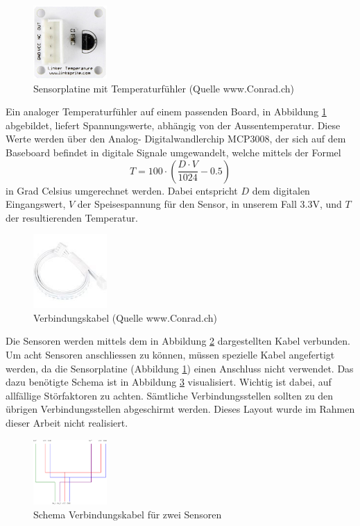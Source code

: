 \begin{figure}[H]%
\centering
\includegraphics[width=0.25\textwidth]{Images/Sensorplatine.jpg}
\caption{Sensorplatine mit Temperaturfühler (Quelle www.Conrad.ch)}
\label{fig:sensor}
\end{figure}

Ein analoger Temperaturfühler auf einem passenden Board, in Abbildung \ref{fig:sensor} abgebildet, liefert Spannungswerte, abhängig von der Aussentemperatur. Diese Werte werden über den Analog- Digitalwandlerchip MCP3008, der sich auf dem Baseboard befindet in digitale Signale umgewandelt, welche mittels der Formel
\[
	T = 100 \cdot \left( \frac{D \cdot V}{1024} - 0.5 \right) 
\]
in Grad Celsius umgerechnet werden. Dabei entspricht $D$ dem digitalen Eingangswert, $V$ der Speisespannung für den Sensor, in unserem Fall 3.3V, und $T$ der resultierenden Temperatur.

\begin{figure}[H]%
\centering
\includegraphics[width=0.25\textwidth]{Images/Verbindungskabel.jpg}
\caption{Verbindungskabel (Quelle www.Conrad.ch)}
\label{fig:cable}
\end{figure}

Die Sensoren werden mittels dem in Abbildung \ref{fig:cable} dargestellten Kabel verbunden. Um acht Sensoren anschliessen zu können, müssen spezielle Kabel angefertigt werden, da die Sensorplatine (Abbildung \ref{fig:sensor}) einen Anschluss nicht verwendet. Das dazu benötigte Schema ist in Abbildung \ref{fig:schema_doppelsensor} visualisiert. Wichtig ist dabei, auf allfällige Störfaktoren zu achten. Sämtliche Verbindungsstellen sollten zu den übrigen Verbindungsstellen abgeschirmt werden. Dieses Layout wurde im Rahmen dieser Arbeit nicht realisiert.

\begin{figure}[H]%
\centering
\includegraphics[width=0.25\textwidth]{Images/Schema.png}
\caption{Schema Verbindungskabel für zwei Sensoren}
\label{fig:schema_doppelsensor}
\end{figure}

